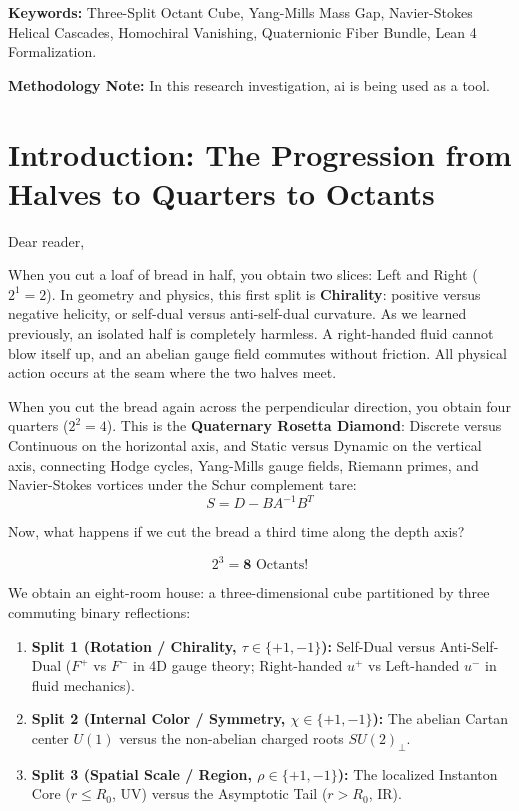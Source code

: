 \documentclass[11pt,a4paper]{article}
\begin{document}
\vspace{0.5cm}
\noindent\textbf{Keywords:} Three-Split Octant Cube, Yang-Mills Mass Gap, Navier-Stokes Helical Cascades, Homochiral Vanishing, Quaternionic Fiber Bundle, Lean 4 Formalization.

\vspace{0.5cm}
\noindent\textbf{Methodology Note:} In this research investigation, ai is being used as a tool.

\newpage
\tableofcontents
\newpage

\section{Introduction: The Progression from Halves to Quarters to Octants}

Dear reader,

When you cut a loaf of bread in half, you obtain two slices: Left and Right ($2^1 = 2$). In geometry and physics, this first split is \textbf{Chirality}: positive versus negative helicity, or self-dual versus anti-self-dual curvature. As we learned previously, an isolated half is completely harmless. A right-handed fluid cannot blow itself up, and an abelian gauge field commutes without friction. All physical action occurs at the seam where the two halves meet.

When you cut the bread again across the perpendicular direction, you obtain four quarters ($2^2 = 4$). This is the \textbf{Quaternary Rosetta Diamond}: Discrete versus Continuous on the horizontal axis, and Static versus Dynamic on the vertical axis, connecting Hodge cycles, Yang-Mills gauge fields, Riemann primes, and Navier-Stokes vortices under the Schur complement tare:
$$S = D - B A^{-1} B^T$$

Now, what happens if we cut the bread a third time along the depth axis?

$$2^3 = \mathbf{8} \text{ Octants!}$$

We obtain an eight-room house: a three-dimensional cube partitioned by three commuting binary reflections:
\begin{enumerate}
    \item \textbf{Split 1 (Rotation / Chirality, $\tau \in \{+1, -1\}$):} Self-Dual versus Anti-Self-Dual ($F^+$ vs $F^-$ in 4D gauge theory; Right-handed $u^+$ vs Left-handed $u^-$ in fluid mechanics).
    \item \textbf{Split 2 (Internal Color / Symmetry, $\chi \in \{+1, -1\}$):} The abelian Cartan center $U(1)$ versus the non-abelian charged roots $SU(2)_\perp$.
    \item \textbf{Split 3 (Spatial Scale / Region, $\rho \in \{+1, -1\}$):} The localized Instanton Core ($r \le R_0$, UV) versus the Asymptotic Tail ($r > R_0$, IR).
\end{enumerate}
\end{document}
